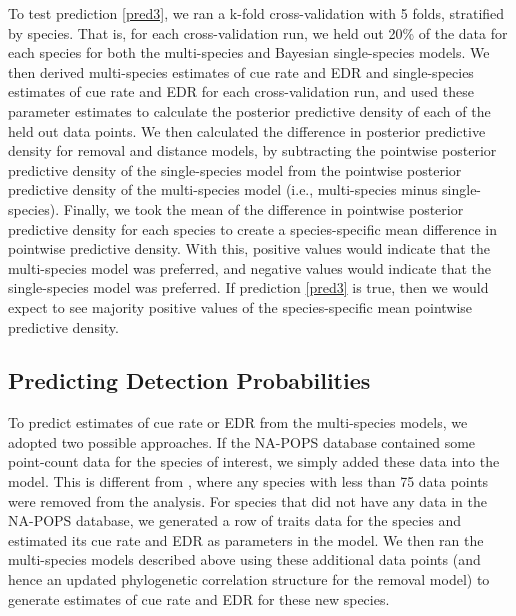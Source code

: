 \documentclass[12pt]{article}
\begin{document}
\par To test prediction \ref{pred3}, we ran a k-fold cross-validation with 5 folds, stratified by species. That is, for each cross-validation run, we held out 20\% of the data for each species for both the multi-species and Bayesian single-species models. 
We then derived multi-species estimates of cue rate and EDR and single-species estimates of cue rate and EDR for each cross-validation run, and used these parameter estimates to calculate the posterior predictive density of each of the held out data points. 
We then calculated the difference in posterior predictive density for removal and distance models, by subtracting the pointwise posterior predictive density of the single-species model from the pointwise posterior predictive density of the multi-species model (i.e., multi-species minus single-species).
Finally, we took the mean of the difference in pointwise posterior predictive density for each species to create a species-specific mean difference in pointwise predictive density.
With this, positive values would indicate that the multi-species model was preferred, and negative values would indicate that the single-species model was preferred.
If prediction \ref{pred3} is true, then we would expect to see majority positive values of the species-specific mean pointwise predictive density.


\subsection{Predicting Detection Probabilities}
\par To predict estimates of cue rate or EDR from the multi-species models, we adopted two possible approaches.
If the NA-POPS database contained some point-count data for the species of interest, we simply added these data into the model.
This is different from \citet{edwards_point_2023, solymos_calibrating_2013, solymos_evaluating_2018}, where any species with less than 75 data points were removed from the analysis.
For species that did not have any data in the NA-POPS database, we generated a row of traits data for the species and estimated its cue rate and EDR as parameters in the model.
We then ran the multi-species models described above using these additional data points (and hence an updated phylogenetic correlation structure for the removal model) to generate estimates of cue rate and EDR for these new species.
\end{document}
